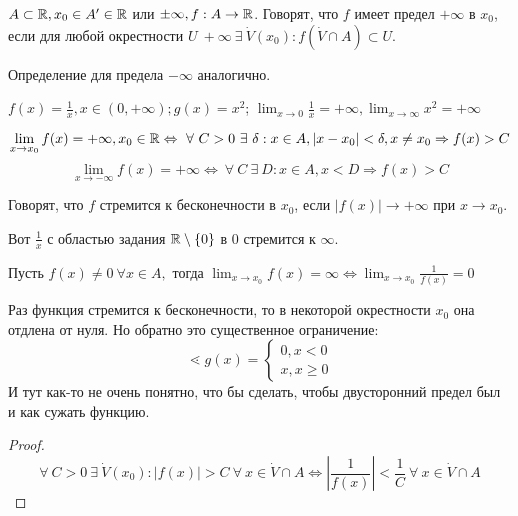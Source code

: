 \documentclass[12pt]{report}
\begin{document}
\begin{defn}
$A \subset \mathbb{R}, x_0 \in A' \in \mathbb{R}$ или $\pm\infty, f: A \to \mathbb{R}$. Говорят, что $f$ имеет предел $+\infty$ в $x_0$, если для любой окрестности $U ~+\infty ~\exists ~\dot V(x_0): f(\dot V \cap A) \subset U$.

Определение для предела $-\infty$ аналогично. 
\end{defn}

\begin{ex}
$f(x) = \frac{1}{x}, x \in (0, +\infty); g(x) = x^2$; $\lim_{x \to 0}{\frac{1}{x}} = +\infty, \lim_{x \to \infty}{x^2} = +\infty$
\end{ex}

\begin{defn}
$$\lim_{x \to x_0}{f(x)} = +\infty, x_0 \in \mathbb{R} \Leftrightarrow ~\forall ~C > 0 ~\exists ~\delta: x\in A, |x - x_0| < \delta, x \neq x_0 \Rightarrow f(x) > C$$
$$\lim_{x \to -\infty}{f(x)} = +\infty \Leftrightarrow ~\forall ~C ~\exists ~D: x \in A, x < D \Rightarrow f(x) > C$$
\end{defn}

\begin{rem}
Говорят, что $f$ стремится к бесконечности в $x_0$, если $|f(x)| \to +\infty$ при $x \to x_0$.

Вот $\frac{1}{x}$ с областью задания $\mathbb{R}\setminus \{0\}$ в $0$ стремится к $\infty$.
\end{rem}

\begin{thm}
Пусть $f(x) \neq 0 ~\forall x \in A,$ тогда $\lim_{x \to x_0}{f(x)} = \infty \Leftrightarrow \lim_{x \to x_0}{\frac{1}{f(x)}} = 0$
\end{thm}
\begin{note}
Раз функция стремится к бесконечности, то в некоторой окрестности $x_0$ она отдлена от нуля. Но обратно это существенное ограничение:
$$\lessdot g(x) = 
\left\{
\begin{matrix}
0, x < 0\\
x, x \ge 0
\end{matrix}\right.
$$
И тут как-то не очень понятно, что бы сделать, чтобы двусторонний предел был и как сужать функцию.
\end{note}
\begin{proof}
$$\forall ~C > 0 ~\exists ~\dot V(x_0): |f(x)| > C  ~\forall ~x \in \dot V \cap A \Leftrightarrow |\frac{1}{f(x)}| < \frac{1}{C} ~\forall ~x \in \dot V \cap A $$
\end{proof}
\end{document}
